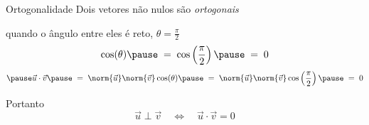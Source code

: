 \documentclass[fleqn,aspectratio=169,12pt]{beamer}
\begin{document}
\begin{frame}{Ortogonalidade}
  Dois vetores não nulos são \emph{ortogonais}

  \pause
  quando o ângulo entre eles é reto,
  \(
    \theta = \frac{\pi}{2}
  \)
  \pause
  \[
    \cos(\theta)
    \pause
    \;=\; \cos\left(\frac{\pi}{2}\right)
    \pause
    \;=\; 0
  \]
  \[
    \pause
    \vec{u}\cdot\vec{v}
    \pause
    \;=\; \norm{\vec{u}} \norm{\vec{v}} \cos(\theta)
    \pause
    \;=\; \norm{\vec{u}} \norm{\vec{v}} \cos\left(\frac{\pi}{2}\right)
    \pause
    \;=\; 0
  \]

  \pause
  Portanto
  \[
    \vec{u}\perp\vec{v}
    \quad\Leftrightarrow\quad
    \vec{u}\cdot\vec{v} = 0
  \]
\end{frame}



%
%

\end{document}
